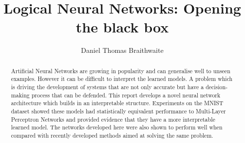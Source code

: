 \documentclass[11pt
              , a4paper
              , openright
              ]{report}
\title{Logical Neural Networks: Opening the black box}
\author{Daniel Thomas Braithwaite}
\date{}
\theoremstyle{definition}
\begin{document}
\frontmatter



\begin{abstract}
Artificial Neural Networks are growing in popularity and can generalise well to unseen examples. However it can be difficult to interpret the learned models. A problem which is driving the development of systems that are not only accurate but have a decision-making process that can be defended. This report develops a novel neural network architecture which builds in an interpretable structure. Experiments on the MNIST dataset showed these models had statistically equivalent performance to Multi-Layer Perceptron Networks and provided evidence that they have a more interpretable learned model. The networks developed here were also shown to perform well when compared with recently developed methods aimed at solving the same problem.

\end{abstract}


\maketitle



\tableofcontents



\mainmatter









\backmatter



%




\end{document}
